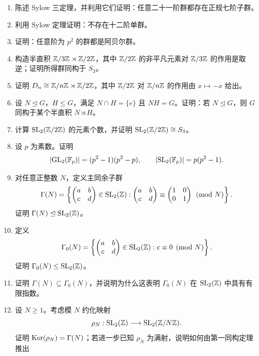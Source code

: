 \begin{enumerate}[start=56, label=\textbf{习题6.\arabic*.}, leftmargin=7em]
  \item \hard 陈述 Sylow 三定理，并利用它们证明：任意二十一阶群都存在正规七阶子群。
  \item \hard 利用 Sylow 定理证明：不存在十二阶单群。
  \item \hard 证明：任意阶为 $p^2$ 的群都是阿贝尔群。
  \item \hard 构造半直积 $\mathbb{Z}/3\mathbb{Z} \rtimes \mathbb{Z}/2\mathbb{Z}$，其中 $\mathbb{Z}/2\mathbb{Z}$ 的非平凡元素对 $\mathbb{Z}/3\mathbb{Z}$ 的作用是取逆；证明所得群同构于 $S_3$。
  \item \hard 证明 $D_n \cong \mathbb{Z}/n\mathbb{Z} \rtimes \mathbb{Z}/2\mathbb{Z}$，其中 $\mathbb{Z}/2\mathbb{Z}$ 对 $\mathbb{Z}/n\mathbb{Z}$ 的作用由 $x\mapsto -x$ 给出。
  \item \hard 设 $N\trianglelefteq G$，$H\le G$，满足 $N\cap H=\{e\}$ 且 $NH=G$。证明：若 $N\trianglelefteq G$，则 $G$ 同构于某个半直积 $N \rtimes H$。
  \item \hard 计算 $\mathrm{SL}_2(\mathbb{Z}/2\mathbb{Z})$ 的元素个数，并证明 $\mathrm{SL}_2(\mathbb{Z}/2\mathbb{Z}) \cong S_3$。
  \item \hard 设 $p$ 为素数。证明
  \[
    |\mathrm{GL}_2(\mathbb{F}_p)|=(p^2-1)(p^2-p), \qquad |\mathrm{SL}_2(\mathbb{F}_p)|=p(p^2-1).
  \]
  \item \hard 对任意正整数 $N$，定义主同余子群
  \[
    \Gamma(N)=\left\{\begin{pmatrix}a&b\\ c&d\end{pmatrix}\in \mathrm{SL}_2(\mathbb{Z}):
    \begin{pmatrix}a&b\\ c&d\end{pmatrix} \equiv \begin{pmatrix}1&0\\ 0&1\end{pmatrix} \pmod N\right\}.
  \]
  证明 $\Gamma(N)\trianglelefteq \mathrm{SL}_2(\mathbb{Z})$。
  \item \hard 定义
  \[
    \Gamma_0(N)=\left\{\begin{pmatrix}a&b\\ c&d\end{pmatrix}\in \mathrm{SL}_2(\mathbb{Z}): c \equiv0 \pmod N\right\}.
  \]
  证明 $\Gamma_0(N)\le \mathrm{SL}_2(\mathbb{Z})$。
  \item \hard 证明 $\Gamma(N)\subseteq \Gamma_0(N)$，并说明为什么这表明 $\Gamma_0(N)$ 在 $\mathrm{SL}_2(\mathbb{Z})$ 中具有有限指数。
  \item \hard 设 $N\ge1$。考虑模 $N$ 约化映射
  \[
    \rho_N:\mathrm{SL}_2(\mathbb{Z}) \longrightarrow \mathrm{SL}_2(\mathbb{Z}/N\mathbb{Z}).
  \]
  证明 $\mathrm{Ker}(\rho_N)=\Gamma(N)$；若进一步已知 $\rho_N$ 为满射，说明如何由第一同构定理推出

\end{enumerate}
